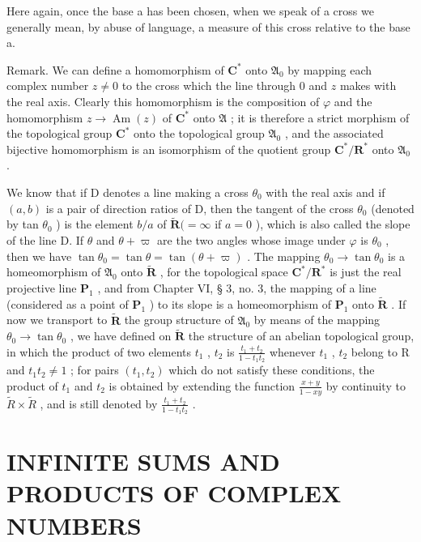 Here again, once the base a has been chosen, when we speak of a cross we generally mean, by abuse of language, a measure of this cross relative to the base a.

Remark. We can define a homomorphism of \(\mathbf{C}^*\) onto \(\mathfrak{A}_0\) by mapping each complex number \(z \neq 0\) to the cross which the line through \(0\) and \(z\) makes with the real axis. Clearly this homomorphism is the composition of \(\varphi\) and the homomorphism \(z \to \operatorname{Am}(z)\) of \(\mathbf{C}^*\) onto \(\mathfrak{A}\) ; it is therefore a strict morphism of the topological group \(\mathbf{C}^*\) onto the topological group \(\mathfrak{A}_0\) , and the associated bijective homomorphism is an isomorphism of the quotient group \(\mathbf{C}^*/\mathbf{R}^*\) onto \(\mathfrak{A}_0\) .

We know that if D denotes a line making a cross \(\theta_0\) with the real axis and if \((a, b)\) is a pair of direction ratios of D, then the tangent of the cross \(\theta_0\) (denoted by tan \(\theta_0\) ) is the element \(b/a\) of \(\tilde{\mathbf{R}} (= \infty\) if \(a = 0\) ), which is also called the slope of the line D. If \(\theta\) and \(\theta + \varpi\) are the two angles whose image under \(\varphi\) is \(\theta_0\) , then we have \(\tan \theta_0 = \tan \theta = \tan (\theta + \varpi)\) . The mapping \(\theta_0 \to \tan \theta_0\) is a homeomorphism of \(\mathfrak{A}_0\) onto \(\tilde{\mathbf{R}}\) , for the topological space \(\mathbf{C}^*/\mathbf{R}^*\) is just the real projective line \(\mathbf{P}_1\) , and from Chapter VI, § 3, no. 3, the mapping of a line (considered as a point of \(\mathbf{P}_1\) ) to its slope is a homeomorphism of \(\mathbf{P}_1\) onto \(\tilde{\mathbf{R}}\) . If now we transport to \(\tilde{\mathbf{R}}\) the group structure of \(\mathfrak{A}_0\) by means of the mapping \(\theta_0 \to \tan \theta_0\) , we have defined on \(\tilde{\mathbf{R}}\) the structure of an abelian topological group, in which the product of two elements \(t_1\) , \(t_2\) is \(\frac{t_1 + t_2}{1 - t_1 t_2}\) whenever \(t_1\) , \(t_2\) belong to R and \(t_1 t_2 \neq 1\) ; for pairs \((t_1, t_2)\) which do not satisfy these conditions, the product of \(t_{1}\) and \(t_{2}\) is obtained by extending the function \(\frac{x+y}{1-xy}\) by continuity to \(\tilde{R}\times\tilde{R}\) , and is still denoted by \(\frac{t_{1}+t_{2}}{1-t_{1}t_{2}}\) .

\section{INFINITE SUMS AND PRODUCTS OF COMPLEX NUMBERS}

